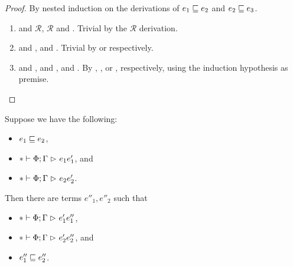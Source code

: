\begin{proof}
By nested induction on the derivations of $e_1 \mathrel{\sqsubseteq} e_2$ and $e_2 \mathrel{\sqsubseteq} e_3$.
\begin{enumerate}[noitemsep, label=\textbf{Cases}, leftmargin=*, labelindent=\parindent]
  \item {} and $\mathcal{R}$, $\mathcal{R}$ and .
    Trivial by the $\mathcal{R}$ derivation.
  \item {} and ,  and .
    Trivial by  or  respectively.
  \item {} and ,  and ,  and .
    By , , or , respectively,
    using the induction hypothesis as premise. \qedhere
\end{enumerate}
\end{proof}

\begin{lemma} \label{lem:confluence-acum}
Suppose we have the following:
\begin{itemize}[noitemsep]
  \item $e_1 \mathrel{\sqsubseteq} e_2$,
  \item $* \mathrel{\vdash} \Phi; \Gamma \mathrel{\rhd}_{} e_1{e'_1}$, and
  \item $* \mathrel{\vdash} \Phi; \Gamma \mathrel{\rhd}_{} e_2{e'_2}$.
\end{itemize}
Then there are terms $e''_1, e''_2$ such that
\begin{itemize}[noitemsep]
  \item $* \mathrel{\vdash} \Phi; \Gamma \mathrel{\rhd}_{} e'_1{e''_1}$,
  \item $* \mathrel{\vdash} \Phi; \Gamma \mathrel{\rhd}_{} e'_2{e''_2}$, and
  \item $e''_1 \mathrel{\sqsubseteq} e''_2$.
\end{itemize}
\end{lemma}

